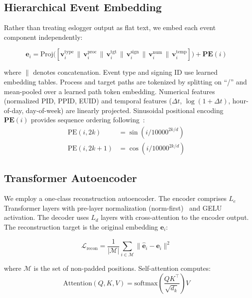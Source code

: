 \documentclass[letterpaper,twocolumn,10pt]{article}
\begin{document}
\subsection{Hierarchical Event Embedding}

Rather than treating eslogger output as flat text, we embed each
event component independently:

\begin{equation}
\mathbf{e}_i = \text{Proj}\Big(
[\mathbf{v}^{\text{type}}_i \,\|\,
\mathbf{v}^{\text{proc}}_i \,\|\,
\mathbf{v}^{\text{tgt}}_i \,\|\,
\mathbf{v}^{\text{sign}}_i \,\|\,
\mathbf{v}^{\text{num}}_i \,\|\,
\mathbf{v}^{\text{temp}}_i]
\Big) + \mathbf{PE}(i)
\label{eq:embedding}
\end{equation}

\noindent where $\|$ denotes concatenation. Event type and signing
ID use learned embedding tables. Process and target paths are
tokenized by splitting on ``/'' and mean-pooled over a learned
path token embedding. Numerical features (normalized PID, PPID,
EUID) and temporal features ($\Delta t$, $\log(1+\Delta t)$,
hour-of-day, day-of-week) are linearly projected. Sinusoidal
positional encoding $\mathbf{PE}(i)$ provides sequence ordering
following~\cite{vaswani}:
\begin{align}
\text{PE}(i, 2k) &= \sin(i / 10000^{2k/d}) \\
\text{PE}(i, 2k\!+\!1) &= \cos(i / 10000^{2k/d})
\end{align}

\subsection{Transformer Autoencoder}

We employ a one-class reconstruction autoencoder. The encoder
comprises $L_e$ Transformer layers with pre-layer normalization
(norm-first)~\cite{xiong2020layer} and GELU activation. The decoder
uses $L_d$ layers with cross-attention to the encoder output. The
reconstruction target is the original embedding $\mathbf{e}_i$:

\begin{equation}
\mathcal{L}_{\text{recon}} = \frac{1}{|\mathcal{M}|}
\sum_{i \in \mathcal{M}}
\|\hat{\mathbf{e}}_i - \mathbf{e}_i\|^2
\label{eq:loss}
\end{equation}

\noindent where $\mathcal{M}$ is the set of non-padded positions.
Self-attention computes:
\begin{equation}
\text{Attention}(Q,K,V) =
\text{softmax}\!\left(\frac{QK^\top}{\sqrt{d_k}}\right) V
\end{equation}
\end{document}
